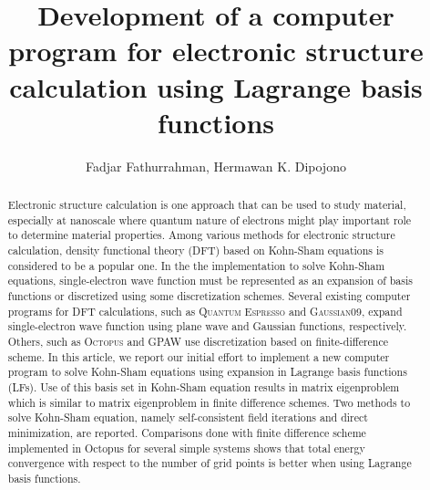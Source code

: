 \documentclass[a4paper]{jpconf}
\begin{document}
\title{Development of a computer program for electronic structure calculation using Lagrange basis functions}
\author{Fadjar Fathurrahman, Hermawan K. Dipojono}
\address{
Department of Engineering Physics, Bandung Institute of Technology \\
Research Center for Nanoscience and Nanotechnology, Bandung Institute of Technology
}

\begin{abstract}
Electronic structure calculation is one approach that can be used to study material,
especially at nanoscale where quantum nature of electrons might play important role
to determine material properties. Among various methods for electronic structure calculation,
density functional theory (DFT) based on Kohn-Sham equations is considered to be a popular one.
In the the implementation to solve Kohn-Sham equations, single-electron wave function must be
represented as an expansion of basis functions or discretized using
some discretization schemes. Several
existing computer programs for DFT calculations, such as
\textsc{Quantum Espresso} and \textsc{Gaussian09},
expand single-electron wave function using plane wave and Gaussian functions, respectively.
Others, such as \textsc{Octopus} and GPAW use discretization based on finite-difference scheme.
In this article, we report our initial effort to implement a new computer program to
solve Kohn-Sham equations using expansion in Lagrange basis functions (LFs).
Use of this basis set in Kohn-Sham equation results in matrix eigenproblem which
is similar to matrix eigenproblem in finite difference schemes. Two methods to solve
Kohn-Sham equation, namely self-consistent field iterations and direct minimization,
are reported. Comparisons done with finite difference scheme implemented in Octopus
for several simple systems shows that total energy convergence with respect to the number
of grid points is better when using Lagrange basis functions.
\end{abstract}










\end{document}
